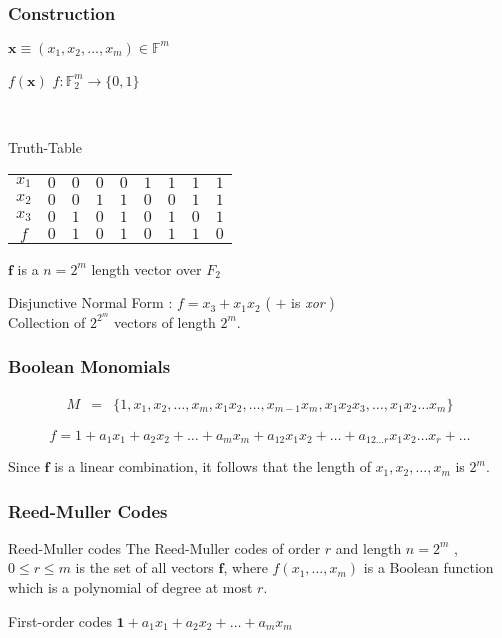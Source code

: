 \documentclass[xcolor=xvgnames]{beamer}
\newcommand{\rem}{Reed-Muller}
\newcommand{\F}{\ensuremath{\mathbb{F}}}
\newcommand{\V}[1]{\ensuremath{\mathbf{#1}}}
\begin{document}
\begin{frame}
\frametitle{Construction}
\begin{center}
$\V{x} \equiv (x_1,x_2,\ldots,x_m) \in \F^m$ 

$f(\V{x})$  \quad $f: \F_{2}^{m} \rightarrow \{0,1\} $ 
\end{center}
\\

\begin {center}Truth-Table \\
\begin{tabular}{|c|c|c|c|c|c|c|c|c|}
\hline
$x_1$ & $0$ & $0$ & $0$ & $0$ & $1$ & $1$ & $1$ & $1$ \\
$x_2$ & $0$ & $0$ & $1$ & $1$ & $0$ & $0$ & $1$ & $1$ \\
$x_3$ & $0$ & $1$ & $0$ & $1$ & $0$ & $1$ & $0$ & $1$ \\
\hline
$f$   & $0$ & $1$ & $0$ & $1$ & $0$ & $1$ & $1$ & $0$ \\
\hline
\end{tabular}
\end{center} 
$\V{f}$ is a $n=2^m$ length vector over $F_2$

\alert{Disjunctive Normal Form :} $f = x_3 + x_1x_2$  \quad ( $+$ is \emph{xor} ) \\

Collection of $2^{2^m}$ vectors of length $2^m$.
\end{frame}



\begin{frame}
 \frametitle{Boolean Monomials}
\begin{eqnarray*}
M &=& \{1,x_1,x_2,\ldots,x_m, x_1x_2,\ldots,x_{m-1}x_m,x_1x_2x_3,\ldots,x_1x_2\ldots x_m\}
\end{eqnarray*}

\begin{equation*}
  f = 1 + a_1x_1+a_2x_2+\ldots+a_mx_m + a_{12}x_1x_2+\ldots+a_{12\ldots r}x_1x_2\ldots x_r+\ldots
\end{equation*}

Since $\V{f}$ is a linear combination, it follows that the length of $x_1, x_2,\ldots,x_m$ is $2^m$.
\end{frame}



\begin{frame}
 \frametitle{Reed-Muller Codes}

\begin{block}{Reed-Muller codes}
The \alert{\rem{} codes} of order $r$ and length $n = 2^m$ ,$0 \leq r \leq m$  is the set of all vectors $\V{f}$, where $f(x_1,\ldots,x_m)$ is a Boolean function which is a polynomial of degree at most $r$.
\end{block}

\begin{block}{First-order codes}
 $\V{1}+a_1x_1+a_2x_2+\ldots+a_mx_m$
\end{block}

\end{frame}
\end{document}
